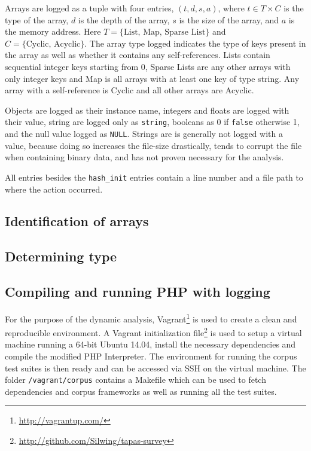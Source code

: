 Arrays are logged as a tuple with four entries, $(t,d,s,a)$, where $t\in T\times C$ is the type of the array, $d$ is the depth of the array, $s$ is the size of the array, and $a$ is the memory address. Here $T = \{\text{List, Map, Sparse List}\}$ and $C = \{\text{Cyclic, Acyclic}\}$. The array type logged indicates the type of keys present in the array as well as whether it contains any self-references. Lists contain sequential integer keys starting from 0, Sparse Lists are any other arrays with only integer keys and Map is all arrays with at least one key of type string. Any array with a self-reference is Cyclic and all other arrays are Acyclic.

Objects are logged as their instance name, integers and floats are logged with their value, string are logged only as \texttt{string}, booleans as $0$ if \texttt{false} otherwise 1, and the null value logged as \texttt{NULL}. Strings are is generally not logged with a value, because doing so increases the file-size drastically, tends to corrupt the file when containing binary data, and has not proven necessary for the analysis.

All entries besides the \texttt{hash\_init} entries contain a line number and a file path to where the action occurred. 

\subsection{Identification of arrays}


\subsection{Determining type}


\subsection{Compiling and running PHP with logging}
For the purpose of the dynamic analysis, Vagrant\footnote{\url{http://vagrantup.com/}} is used to create a clean and reproducible environment. A Vagrant initialization file\footnote{\url{http://github.com/Silwing/tapas-survey}} is used to setup a virtual machine running a 64-bit Ubuntu 14.04, install the necessary dependencies and compile the modified PHP Interpreter. The environment for running the corpus test suites is then ready and can be accessed via SSH on the virtual machine. The folder \texttt{/vagrant/corpus} contains a Makefile which can be used to fetch dependencies and corpus frameworks as well as running all the test suites.

